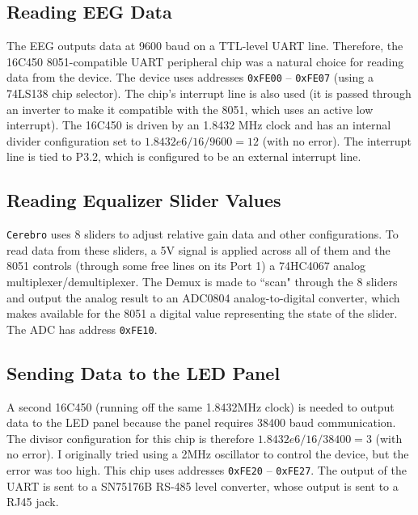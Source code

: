 \documentclass[letterpaper,10pt,notitlepage]{report}
\newcommand{\projname}{\texttt{Cerebro}}
\newcommand{\dat}[1]{\texttt{#1}}
\begin{document}
    \subsection{Reading EEG Data}

        The EEG outputs data at 9600 baud on a TTL-level UART line.  Therefore,
        the 16C450 8051-compatible UART peripheral chip was a natural choice
        for reading data from the device.  The device uses addresses
        \dat{0xFE00} -- \dat{0xFE07} (using a 74LS138 chip selector).  The
        chip's interrupt line is also used (it is passed through an inverter to
        make it compatible with the 8051, which uses an active low interrupt).
        The 16C450 is driven by an 1.8432 MHz clock and has an internal divider
        configuration set to $1.8432e6/16/9600 = 12$ (with no error).  The
        interrupt line is tied to P3.2, which is configured to be an external
        interrupt line.

    \subsection{Reading Equalizer Slider Values}

        \projname{} uses 8 sliders to adjust relative gain data and other
        configurations.  To read data from these sliders, a 5V signal is
        applied across all of them and the 8051 controls (through some free
        lines on its Port 1) a 74HC4067 analog multiplexer/demultiplexer.  The
        Demux is made to ``scan" through the 8 sliders and output the analog
        result to an ADC0804 analog-to-digital converter, which makes available
        for the 8051 a digital value representing the state of the slider.  The
        ADC has address \dat{0xFE10}.

    \subsection{Sending Data to the LED Panel}

        A second 16C450 (running off the same 1.8432MHz clock) is needed to
        output data to the LED panel because the panel requires 38400 baud
        communication.  The divisor configuration for this chip is therefore
        $1.8432e6/16/38400 = 3$ (with no error).  I originally tried using a
        2MHz oscillator to control the device, but the error was too high.
        This chip uses addresses \dat{0xFE20} -- \dat{0xFE27}.  The output of
        the UART is sent to a SN75176B RS-485 level converter, whose output is
        sent to a RJ45 jack.
\end{document}
